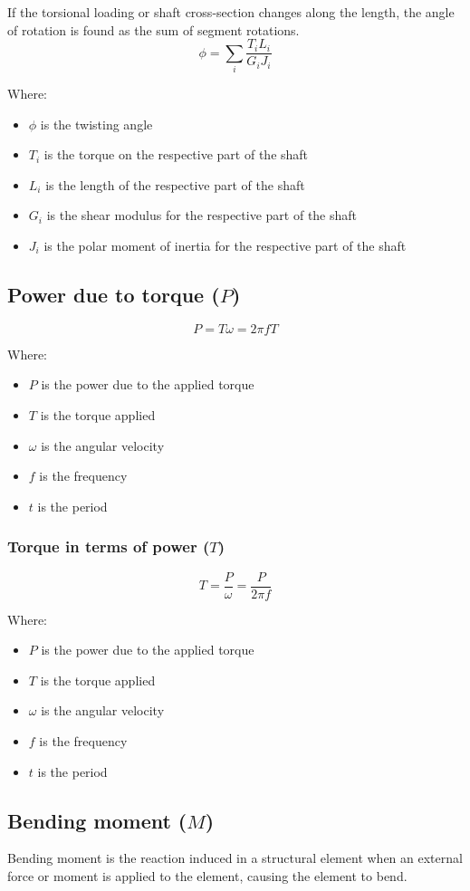 \documentclass[11pt]{article}
\begin{document}
If the torsional loading or shaft cross-section changes along the length, the angle of rotation is found as the sum of segment rotations.
\[\phi = \sum_i \frac{T_i L_i}{G_i J_i}\]

Where:
\begin{itemize}
\item \(\phi\) is the twisting angle
\item \(T_i\) is the torque on the respective part of the shaft
\item \(L_i\) is the length of the respective part of the shaft
\item \(G_i\) is the shear modulus for the respective part of the shaft
\item \(J_i\) is the polar moment of inertia for the respective part of the shaft
\end{itemize}

\subsection{Power due to torque (\(P\))}
\label{sec:org2d8b64e}
\[P = T \omega = 2 \pi f T\]

Where:
\begin{itemize}
\item \(P\) is the power due to the applied torque
\item \(T\) is the torque applied
\item \(\omega\) is the angular velocity
\item \(f\) is the frequency
\item \(t\) is the period
\end{itemize}

\subsubsection{Torque in terms of power (\(T\))}
\label{sec:orgdd0405f}
\[T = \frac{P}{\omega} = \frac{P}{2 \pi f}\]

Where:
\begin{itemize}
\item \(P\) is the power due to the applied torque
\item \(T\) is the torque applied
\item \(\omega\) is the angular velocity
\item \(f\) is the frequency
\item \(t\) is the period
\end{itemize}

\subsection{Bending moment (\(M\))}
\label{sec:org7ca223a}
Bending moment is the reaction induced in a structural element when an external force or moment is applied to the element, causing the element to bend.
\end{document}
